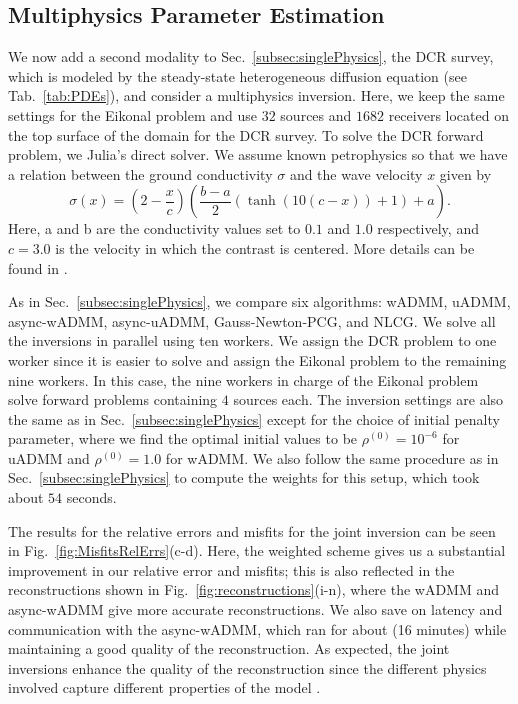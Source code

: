 \documentclass[11pt]{article}          %
\begin{document}
\subsection{Multiphysics Parameter Estimation}
\label{subsec:jointInversion}
We now add a second modality to Sec.~\ref{subsec:singlePhysics}, the DCR survey, which is modeled by the steady-state heterogeneous diffusion equation (see Tab.~\ref{tab:PDEs}), and consider a multiphysics inversion. Here, we keep the same settings for the Eikonal problem and use $32$ sources and $1682$ receivers located on the top surface of the domain for the DCR survey. To solve the DCR forward problem, we Julia's direct solver. We assume known petrophysics \cite{schon2015physical} so that we have a relation between the ground conductivity $\sigma$ and the wave velocity $x$ given by
\begin{equation}
  \sigma(x) = \left(2 - \frac{x}{c} \right) \left(\frac{b-a}{2} (\tanh(10(c-x))+1)+a \right).
\end{equation}
Here, a and b are the conductivity values set to $0.1$ and $1.0$ respectively, and $c = 3.0$ is the velocity in which the contrast is centered. More details can be found in \cite{ruthotto2017jinv}. 

As in Sec.~\ref{subsec:singlePhysics}, we compare six algorithms: wADMM, uADMM, async-wADMM, async-uADMM, Gauss-Newton-PCG, and NLCG.
We solve all the inversions in parallel using ten workers. We assign the DCR problem to one worker since it is easier to solve and assign the Eikonal problem to the remaining nine workers. In this case, the nine workers in charge of the Eikonal problem solve forward problems containing $4$ sources each. The inversion settings are also the same as in Sec.~\ref{subsec:singlePhysics} except for the choice of initial penalty parameter, where we find the optimal initial values to be $\rho^{(0)} = 10^{-6}$ for uADMM and $\rho^{(0)} = 1.0$ for wADMM. We also follow the same procedure as in Sec.~\ref{subsec:singlePhysics} to compute the weights for this setup, which took about $54$ seconds.

The results for the relative errors and misfits for the joint inversion can be seen in Fig.~\ref{fig:MisfitsRelErrs}(c-d). Here, the weighted scheme gives us a substantial improvement in our relative error and misfits; this is also reflected in the reconstructions shown in Fig.~\ref{fig:reconstructions}(i-n), where the wADMM and async-wADMM give more accurate reconstructions. We also save on latency and communication with the async-wADMM, which ran for about (16 minutes) while maintaining a good quality of the reconstruction. As expected, the joint inversions enhance the quality of the reconstruction since the different physics involved capture different properties of the model \cite{ruthotto2017jinv}.
\end{document}
